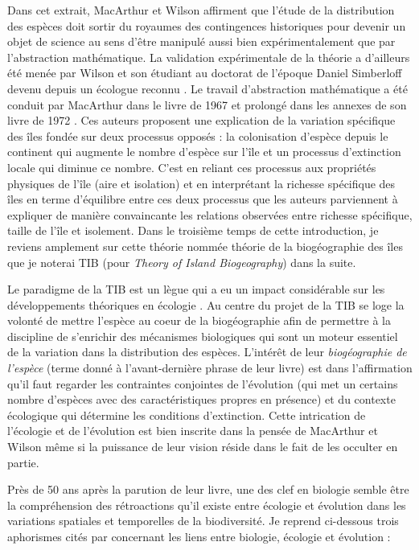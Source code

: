 Dans cet extrait, MacArthur et Wilson affirment que l'étude de la
distribution des espèces doit sortir du royaumes des contingences
historiques pour devenir un objet de science au sens d'être manipulé
aussi bien expérimentalement que par l'abstraction mathématique. La
validation expérimentale de la théorie a d'ailleurs été menée par Wilson
et son étudiant au doctorat de l'époque Daniel Simberloff devenu depuis
un écologue reconnu \citep{Simberloff1969}. Le travail d'abstraction
mathématique a été conduit par MacArthur dans le livre de 1967 et
prolongé dans les annexes de son livre de 1972
\citep{macarthur1972geographical}. Ces auteurs proposent une explication
de la variation spécifique des îles fondée sur deux processus opposés :
la colonisation d'espèce depuis le continent qui augmente le nombre
d'espèce sur l'île et un processus d'extinction locale qui diminue ce
nombre. C'est en reliant ces processus aux propriétés physiques de l'île
(aire et isolation) et en interprétant la richesse spécifique des îles
en terme d'équilibre entre ces deux processus que les auteurs
parviennent à expliquer de manière convaincante les relations observées
entre richesse spécifique, taille de l'île et isolement. Dans le
troisième temps de cette introduction, je reviens amplement sur cette
théorie nommée théorie de la biogéographie des îles que je noterai TIB
(pour \emph{Theory of Island Biogeography}) dans la suite.

Le paradigme de la TIB est un lègue qui a eu un impact considérable sur
les développements théoriques en écologie \citep{Warren2015}. Au centre
du projet de la TIB se loge la volonté de mettre l'espèce au coeur de la
biogéographie afin de permettre à la discipline de s'enrichir des
mécanismes biologiques qui sont un moteur essentiel de la variation dans
la distribution des espèces. L'intérêt de leur \emph{biogéographie de
l'espèce} (terme donné à l'avant-dernière phrase de leur livre) est dans
l'affirmation qu'il faut regarder les contraintes conjointes de
l'évolution (qui met un certains nombre d'espèces avec des
caractéristiques propres en présence) et du contexte écologique qui
détermine les conditions d'extinction. Cette intrication de l'écologie
et de l'évolution est bien inscrite dans la pensée de MacArthur et
Wilson même si la puissance de leur vision réside dans le fait de les
occulter en partie.

Près de 50 ans après la parution de leur livre, une des clef en biologie
semble être la compréhension des rétroactions qu'il existe entre
écologie et évolution dans les variations spatiales et temporelles de la
biodiversité. Je reprend ci-dessous trois aphorismes cités par
\citet{Schoener2011a} concernant les liens entre biologie, écologie et
évolution :

